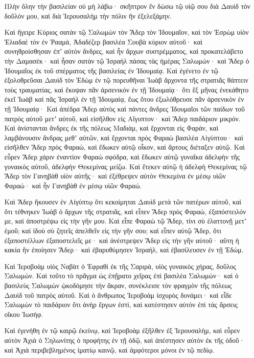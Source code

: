 {Πλὴν ὅλην τὴν βασιλείαν οὐ μὴ λάβω· σκῆπτρον ἓν δώσω τῷ υἱῷ σου διὰ Δαυὶδ τὸν δοῦλόν μου, καὶ διὰ Ἱερουσαλὴμ τὴν πόλιν ἣν ἐξελεξάμην.
\par }{\PP {}Καὶ ἤγειρε Κύριος σατὰν τῷ Σαλωμὼν τὸν Ἄδερ τὸν Ἰδουμαῖον, καὶ τὸν Ἐσρὼμ υἱὸν Ἐλιαδαὲ τὸν ἐν Ῥααμὰ, Ἀδαδέζερ βασιλέα Σουβὰ κύριον αὐτοῦ· καὶ συνηθροίσθησαν ἐπʼ αὐτὸν ἄνδρες, καὶ ἦν ἄρχων συστρέμματος, καὶ προκατελάβετο τὴν Δαμασέκ· καὶ ἦσαν σατὰν τῷ Ἰσραὴλ πάσας τὰς ἡμέρας Σαλωμών· καὶ Ἄδερ ὁ Ἰδουμαῖος ἐκ τοῦ σπέρματος τῆς βασιλείας ἐν Ἰδουμαίᾳ.
Καὶ ἐγένετο ἐν τῷ ἐξολοθρεῦσαι Δαυὶδ τὸν Ἐδὼμ ἐν τῷ πορευθῆναι Ἰωὰβ ἄρχοντα τῆς στρατιᾶς θάπτειν τοὺς τραυματίας, καὶ ἔκοψαν πᾶν ἀρσενικὸν ἐν τῇ Ἰδουμαίᾳ·
ὅτι ἓξ μῆνας ἐνεκάθητο ἐκεῖ Ἰωὰβ καὶ πᾶς Ἰσραὴλ ἐν τῇ Ἰδουμαίᾳ, ἕως ὅτου ἐξωλόθρευσε πᾶν ἀρσενικὸν ἐν τῇ Ἰδουμαίᾳ·
Καὶ ἀπέδρα Ἄδερ αὐτὸς καὶ πάντες ἄνδρες Ἰδουμαῖοι τῶν παίδων τοῦ πατρὸς αὐτοῦ μετʼ αὐτοῦ, καὶ εἰσῆλθον εἰς Αἴγυπτον· καὶ Ἄδερ παιδάριον μικρόν.
Καὶ ἀνίστανται ἄνδρες ἐκ τῆς πόλεως Μαδιὰμ, καὶ ἔρχονται εἰς Φαρὰν, καὶ λαμβάνουσιν ἄνδρας μεθʼ αὑτῶν, καὶ ἔρχονται πρὸς Φαραὼ βασιλέα Αἰγύπτου· καὶ εἰσῆλθεν Ἄδερ πρὸς Φαραὼ, καὶ ἔδωκεν αὐτῷ οἶκον, καὶ ἄρτους διέταξεν αὐτῷ.
Καὶ εὗρεν Ἄδερ χάριν ἐναντίον Φαραὼ σφόδρα, καὶ ἔδωκεν αὐτῷ γυναῖκα ἀδελφὴν τῆς γυναικὸς αὐτοῦ, ἀδελφὴν Θεκεμίνας μείζω. Καὶ ἔτεκεν αὐτῷ ἡ ἀδελφὴ Θεκεμίνας τῷ Ἄδερ τὸν Γανηβὰθ υἱὸν αὐτῆς·
καὶ ἐξέθρεψεν αὐτὸν Θεκεμίνα ἐν μέσῳ υἱῶν Φαραώ· καὶ ἦν Γανηβὰθ ἐν μέσῳ υἱῶν Φαραώ.
\par }{\PP {}Καὶ Ἄδερ ἤκουσεν ἐν Αἰγύπτῳ ὅτι κεκοίμηται Δαυὶδ μετὰ τῶν πατέρων αὐτοῦ, καὶ ὅτι τέθνηκεν Ἰωὰβ ὁ ἄρχων τῆς στρατιᾶς, καὶ εἶπεν Ἄδερ πρὸς Φαραὼ, ἐξαπόστειλόν με, καὶ ἀποστρέψω εἰς τὴν γῆν μου.
Καὶ εἶπε Φαραὼ τῷ Ἄδερ, τίνι σὺ ἐλαττονῇ μετʼ ἐμοῦ; καὶ ἰδοὺ σὺ ζητεῖς ἀπελθεῖν εἰς τὴν γῆν σου; καὶ εἶπεν αὐτῷ Ἄδερ, ὅτι ἐξαποστέλλων ἐξαποστελεῖς με· καὶ ἀνέστρεψεν Ἄδερ εἰς τὴν γῆν αὐτοῦ·
αὕτη ἡ κακία ἣν ἐποίησεν Ἄδερ· καὶ ἐβαρυθύμησεν Ἰσραὴλ, καὶ ἐβασίλευσεν ἐν τῇ Ἐδώμ.
\par }{\PP {}Καὶ Ἱεροβοὰμ υἱὸς Ναβὰτ ὁ Ἐφραθὶ ἐκ τῆς Σαριρὰ, υἱὸς γυναικὸς χήρας, δοῦλος Σαλωμών.
Καὶ τοῦτο τὸ πρᾶγμα ὡς ἐπῇρατο χεῖρας ἐπὶ βασιλέα Σαλωμών· καὶ ὁ βασιλεὺς Σαλωμὼν ᾠκοδόμησε τὴν ἄκραν, συνέκλεισε τὸν φραγμὸν τῆς πόλεως Δαυὶδ τοῦ πατρὸς αὐτοῦ.
Καὶ ὁ ἄνθρωπος Ἱεροβοὰμ ἰσχυρὸς δυνάμει· καὶ εἶδε Σαλωμὼν τὸ παιδάριον ὅτι ἀνὴρ ἔργων ἐστὶ, καὶ κατέστησεν αὐτὸν ἐπὶ τὰς ἄρσεις οἴκου Ἰωσήφ.
\par }{\PP {}Καὶ ἐγενήθη ἐν τῷ καιρῷ ἐκείνῳ, καὶ Ἱεροβοὰμ ἐξῆλθεν ἐξ Ἱερουσαλὴμ, καὶ εὗρεν αὐτὸν Ἀχιὰ ὁ Σηλωνίτης ὁ προφήτης ἐν τῇ ὁδῷ, καὶ ἀπέστησεν αὐτὸν ἐκ τῆς ὁδοῦ· καὶ Ἀχιὰ περιβεβλημένος ἱματίῳ καινῷ, καὶ ἀμφότεροι μόνοι ἐν τῷ πεδίῳ.
}
